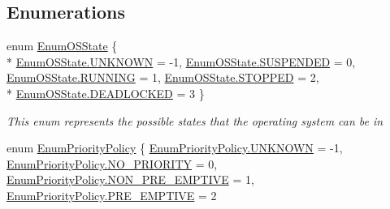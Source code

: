 \subsection*{Enumerations}
\begin{DoxyCompactItemize}
\item 
enum \hyperlink{namespace_c_p_u___o_s___simulator_1_1_operating___system_a03a98a403abc737c106a8f92db5bffc1}{Enum\+O\+S\+State} \{ \\*
\hyperlink{namespace_c_p_u___o_s___simulator_1_1_operating___system_a03a98a403abc737c106a8f92db5bffc1a696b031073e74bf2cb98e5ef201d4aa3}{Enum\+O\+S\+State.\+U\+N\+K\+N\+O\+W\+N} = -\/1, 
\hyperlink{namespace_c_p_u___o_s___simulator_1_1_operating___system_a03a98a403abc737c106a8f92db5bffc1a0cb707127aebaa0023eb38363993843a}{Enum\+O\+S\+State.\+S\+U\+S\+P\+E\+N\+D\+E\+D} = 0, 
\hyperlink{namespace_c_p_u___o_s___simulator_1_1_operating___system_a03a98a403abc737c106a8f92db5bffc1a43491564ebcfd38568918efbd6e840fd}{Enum\+O\+S\+State.\+R\+U\+N\+N\+I\+N\+G} = 1, 
\hyperlink{namespace_c_p_u___o_s___simulator_1_1_operating___system_a03a98a403abc737c106a8f92db5bffc1a09d4d696b4e935115b9313e3c412509a}{Enum\+O\+S\+State.\+S\+T\+O\+P\+P\+E\+D} = 2, 
\\*
\hyperlink{namespace_c_p_u___o_s___simulator_1_1_operating___system_a03a98a403abc737c106a8f92db5bffc1a0550134156d1220fe47b905f3da1080f}{Enum\+O\+S\+State.\+D\+E\+A\+D\+L\+O\+C\+K\+E\+D} = 3
 \}\begin{DoxyCompactList}\small\item\em This enum represents the possible states that the operating system can be in \end{DoxyCompactList}
\item 
enum \hyperlink{namespace_c_p_u___o_s___simulator_1_1_operating___system_a3a9286a473bd079e9c65908c0378fa00}{Enum\+Priority\+Policy} \{ \hyperlink{namespace_c_p_u___o_s___simulator_1_1_operating___system_a3a9286a473bd079e9c65908c0378fa00a696b031073e74bf2cb98e5ef201d4aa3}{Enum\+Priority\+Policy.\+U\+N\+K\+N\+O\+W\+N} = -\/1, 
\hyperlink{namespace_c_p_u___o_s___simulator_1_1_operating___system_a3a9286a473bd079e9c65908c0378fa00a9f68f1d26dd059f9a73e5f66a83bef80}{Enum\+Priority\+Policy.\+N\+O\+\_\+\+P\+R\+I\+O\+R\+I\+T\+Y} = 0, 
\hyperlink{namespace_c_p_u___o_s___simulator_1_1_operating___system_a3a9286a473bd079e9c65908c0378fa00a991a81df1486f1b97a90776f3026ff96}{Enum\+Priority\+Policy.\+N\+O\+N\+\_\+\+P\+R\+E\+\_\+\+E\+M\+P\+T\+I\+V\+E} = 1, 
\hyperlink{namespace_c_p_u___o_s___simulator_1_1_operating___system_a3a9286a473bd079e9c65908c0378fa00a952140b26aa6080871aab2eb7a96feb0}{Enum\+Priority\+Policy.\+P\+R\+E\+\_\+\+E\+M\+P\+T\+I\+V\+E} = 2

\end{DoxyCompactItemize}
